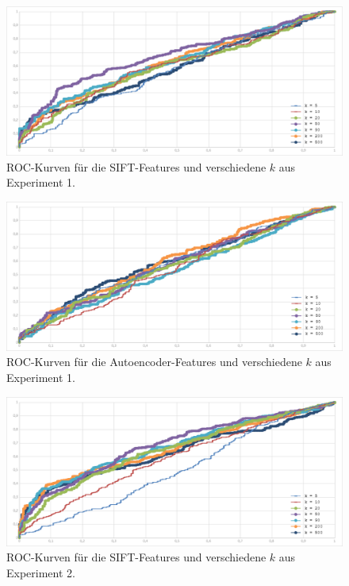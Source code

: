 \begin{figure}
	\centering
	\includegraphics[scale=0.56]{images/exp1_roc128.png}
	\caption{ROC-Kurven für die SIFT-Features und verschiedene $k$ aus Experiment 1.}
	\label{img:roc1}
\end{figure}

\begin{figure}
	\centering
	\includegraphics[scale=0.56]{images/exp1_roc36.png}
	\caption{ROC-Kurven für die Autoencoder-Features und verschiedene $k$ aus Experiment 1.}
	\label{img:roc2}
\end{figure}

\begin{figure}
	\centering
	\includegraphics[scale=0.56]{images/exp2_roc128.png}
	\caption{ROC-Kurven für die SIFT-Features und verschiedene $k$ aus Experiment 2.}
	\label{img:roc3}
\end{figure}

